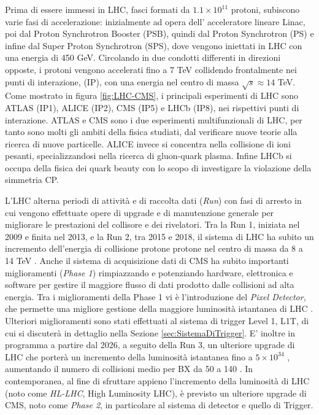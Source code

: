 Prima di essere immessi in LHC, fasci formati da $1.1 \times 10^{11}$ protoni, subiscono varie fasi di accelerazione: inizialmente ad opera dell' acceleratore lineare Linac, poi dal Proton Synchrotron Booster (PSB), quindi dal Proton Synchrotron (PS) e infine dal Super Proton Synchrotron (SPS), dove vengono iniettati in LHC con una energia di 450 GeV. Circolando in due condotti differenti in direzioni opposte, i protoni vengono accelerati fino a 7 TeV collidendo frontalmente nei punti di interazione, (IP), con una energia nel centro di massa $\sqrt{s} \approx 14$ TeV. Come mostrato in figura \ref{fig:LHC-CMS}, i principali esperimenti di LHC sono ATLAS (IP1), ALICE (IP2), CMS (IP5) e LHCb (IP8), nei rispettivi punti di interazione. \newline
ATLAS e CMS sono i due esperimenti multifunzionali di LHC, per tanto sono molti gli ambiti della fisica studiati, dal verificare nuove teorie alla ricerca di nuove particelle. ALICE invece si concentra nella collisione di ioni pesanti, specializzandosi nella ricerca di gluon-quark plasma. Infine LHCb
si occupa della fisica dei quark beauty con lo scopo di investigare la violazione della simmetria CP.

L'LHC alterna periodi di attività e di raccolta dati (\textit{Run}) con fasi di arresto in cui vengono effettuate opere di upgrade e di manutenzione generale per migliorare le prestazioni del collisore e dei rivelatori. Tra la Run 1, iniziata nel 2009 e finita nel 2013, e la Run 2, tra 2015 e 2018, il sistema di LHC ha subito un incremento dell'energia di collisione protone protone nel centro di massa da 8 a 14 TeV \cite{sirunyan2020performance}. Anche il sistema di acquisizione dati di CMS ha subito importanti miglioramenti (\textit{Phase 1}) rimpiazzando e potenziando hardware, elettronica e software per gestire il maggiore flusso di dati prodotto dalle collisioni ad alta energia. Tra i miglioramenti della Phase 1 vi è l'introduzione del \textit{Pixel Detector}, che permette una migliore gestione della maggiore luminosità istantanea di LHC \cite{Adam:2748381}. Ulteriori miglioramenti sono stati effettuati al sistema di trigger Level 1, L1T, di cui si discuterà in dettaglio nella Sezione \ref{sec:SistemaDiTrigger}. \newline
E' inoltre in programma a partire dal 2026, a seguito della Run 3, un ulteriore upgrade di LHC che porterà un incremento della luminosità istantanea fino a $5\times 10^{34}$ \Lumi, aumentando il numero di collisioni medio per BX da 50 a 140 \cite{collaboration2021phase}. In contemporanea, al fine di sfruttare appieno l'incremento della luminosità di LHC (noto come \textit{HL-LHC}, High Luminosity LHC), è previsto un ulteriore upgrade di CMS, noto come \textit{Phase 2}, in particolare al sistema di detector e quello di Trigger.

